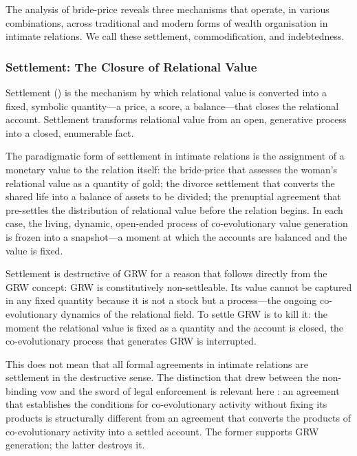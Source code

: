 \noindent
The analysis of bride-price reveals three mechanisms that operate, in various combinations, across traditional and modern forms of wealth organisation in intimate relations. We call these settlement, commodification, and indebtedness.

\subsubsection{Settlement: The Closure of Relational Value}
\label{p15:subsubsec:settlement}

\noindent
Settlement () is the mechanism by which relational value is converted into a fixed, symbolic quantity---a price, a score, a balance---that closes the relational account. Settlement transforms relational value from an open, generative process into a closed, enumerable fact.

The paradigmatic form of settlement in intimate relations is the assignment of a monetary value to the relation itself: the bride-price that assesses the woman's relational value as a quantity of gold; the divorce settlement that converts the shared life into a balance of assets to be divided; the prenuptial agreement that pre-settles the distribution of relational value before the relation begins. In each case, the living, dynamic, open-ended process of co-evolutionary value generation is frozen into a snapshot---a moment at which the accounts are balanced and the value is fixed.

Settlement is destructive of GRW for a reason that follows directly from the GRW concept: GRW is constitutively non-settleable. Its value cannot be captured in any fixed quantity because it is not a stock but a process---the ongoing co-evolutionary dynamics of the relational field. To settle GRW is to kill it: the moment the relational value is fixed as a quantity and the account is closed, the co-evolutionary process that generates GRW is interrupted.

This does not mean that all formal agreements in intimate relations are settlement in the destructive sense. The distinction that  drew between the non-binding vow and the sword of legal enforcement is relevant here \parencite{paperxiii}: an agreement that establishes the conditions for co-evolutionary activity without fixing its products is structurally different from an agreement that converts the products of co-evolutionary activity into a settled account. The former supports GRW generation; the latter destroys it.

